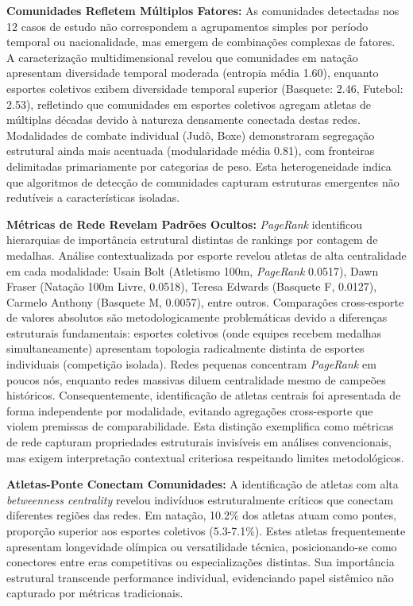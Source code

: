 \textbf{Comunidades Refletem Múltiplos Fatores:} As comunidades detectadas nos 12 casos de estudo não correspondem a agrupamentos simples por período temporal ou nacionalidade, mas emergem de combinações complexas de fatores. A caracterização multidimensional revelou que comunidades em natação apresentam diversidade temporal moderada (entropia média 1.60), enquanto esportes coletivos exibem diversidade temporal superior (Basquete: 2.46, Futebol: 2.53), refletindo que comunidades em esportes coletivos agregam atletas de múltiplas décadas devido à natureza densamente conectada destas redes. Modalidades de combate individual (Judô, Boxe) demonstraram segregação estrutural ainda mais acentuada (modularidade média 0.81), com fronteiras delimitadas primariamente por categorias de peso. Esta heterogeneidade indica que algoritmos de detecção de comunidades capturam estruturas emergentes não redutíveis a características isoladas.

\textbf{Métricas de Rede Revelam Padrões Ocultos:} \textit{PageRank}{} identificou hierarquias de importância estrutural distintas de rankings por contagem de medalhas. Análise contextualizada por esporte revelou atletas de alta centralidade em cada modalidade: Usain Bolt (Atletismo 100m, \textit{PageRank} 0.0517), Dawn Fraser (Natação 100m Livre, 0.0518), Teresa Edwards (Basquete F, 0.0127), Carmelo Anthony (Basquete M, 0.0057), entre outros. Comparações cross-esporte de valores absolutos são metodologicamente problemáticas devido a diferenças estruturais fundamentais: esportes coletivos (onde equipes recebem medalhas simultaneamente) apresentam topologia radicalmente distinta de esportes individuais (competição isolada). Redes pequenas concentram \textit{PageRank}{} em poucos nós, enquanto redes massivas diluem centralidade mesmo de campeões históricos. Consequentemente, identificação de atletas centrais foi apresentada de forma independente por modalidade, evitando agregações cross-esporte que violem premissas de comparabilidade. Esta distinção exemplifica como métricas de rede capturam propriedades estruturais invisíveis em análises convencionais, mas exigem interpretação contextual criteriosa respeitando limites metodológicos.

\textbf{Atletas-Ponte Conectam Comunidades:} A identificação de atletas com alta \textit{betweenness centrality}{} revelou indivíduos estruturalmente críticos que conectam diferentes regiões das redes. Em natação, 10.2\% dos atletas atuam como pontes, proporção superior aos esportes coletivos (5.3-7.1\%). Estes atletas frequentemente apresentam longevidade olímpica ou versatilidade técnica, posicionando-se como conectores entre eras competitivas ou especializações distintas. Sua importância estrutural transcende performance individual, evidenciando papel sistêmico não capturado por métricas tradicionais.

